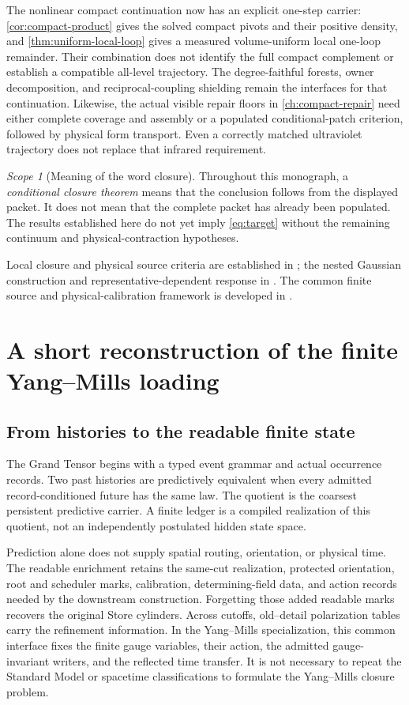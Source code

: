 \documentclass[11pt,oneside,openany]{book}
\theoremstyle{definition}
\theoremstyle{remark}
\newtheorem{scope}[scope]{Scope}
\newcommand{\src}[2]{\cite[#2]{#1}}
\newcommand{\sourcebasis}[1]{\par\smallskip\noindent #1\par}
\begin{document}
The nonlinear compact continuation now has an explicit one-step carrier:
\cref{cor:compact-product} gives the solved compact pivots and their
positive density, and \cref{thm:uniform-local-loop} gives a measured
volume-uniform local one-loop remainder. Their combination does not
identify the full compact complement or establish a compatible
all-level trajectory. The degree-faithful forests, owner decomposition,
and reciprocal-coupling shielding remain the interfaces for that
continuation. Likewise, the actual visible repair floors in
\cref{ch:compact-repair} need either complete coverage and assembly or a
populated conditional-patch criterion, followed by physical form
transport. Even a correctly matched ultraviolet trajectory does not
replace that infrared requirement.

\begin{scope}[Meaning of the word closure]
Throughout this monograph, a \emph{conditional closure theorem} means that the conclusion follows from the displayed packet. It does not mean that the complete packet has already been populated. The results established here do not yet imply \cref{eq:target} without the remaining continuum and physical-contraction hypotheses.
\end{scope}
\sourcebasis{Local closure and physical source criteria are established in \src{F1}{V1--V4}; the nested Gaussian construction and representative-dependent response in \src{F11}{V31--V41}. The common finite source and physical-calibration framework is developed in \cite{GT}.}

\chapter{A short reconstruction of the finite Yang--Mills loading}
\label{ch:finite}
\section{From histories to the readable finite state}
The Grand Tensor begins with a typed event grammar and actual occurrence records. Two past histories are predictively equivalent when every admitted record-conditioned future has the same law. The quotient is the coarsest persistent predictive carrier. A finite ledger is a compiled realization of this quotient, not an independently postulated hidden state space.

Prediction alone does not supply spatial routing, orientation, or physical time. The readable enrichment retains the same-cut realization, protected orientation, root and scheduler marks, calibration, determining-field data, and action records needed by the downstream construction. Forgetting those added readable marks recovers the original Store cylinders. Across cutoffs, old--detail polarization tables carry the refinement information. In the Yang--Mills specialization, this common interface fixes the finite gauge variables, their action, the admitted gauge-invariant writers, and the reflected time transfer. It is not necessary to repeat the Standard Model or spacetime classifications to formulate the Yang--Mills closure problem. \cite{GT}
\end{document}

